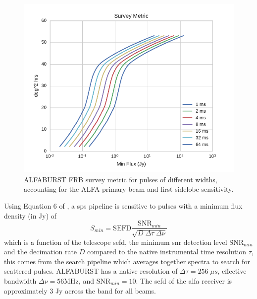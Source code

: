 \documentclass[a4paper,fleqn,usenatbib]{mnras}
\begin{document}
\begin{figure}
    \includegraphics[width=1.0\linewidth]{figures/survey_metric.pdf}
    \caption{ALFABURST FRB survey metric for pulses of different widths,
    accounting for the ALFA primary beam and first sidelobe sensitivity.
    }
    \label{fig:survey_metric}
\end{figure}


Using Equation 6 of \cite{2015MNRAS.452.1254K}, a \gls*{sps} pipeline is
sensitive to pulses with a minimum flux density (in Jy) of
%
\begin{equation}
S_{min} = \textrm{SEFD} \frac{\textrm{SNR}_{min}}{\sqrt{D \; \Delta \tau \;
\Delta \nu}}
\end{equation}
%
which is a function of the telescope \gls*{sefd}, the minimum \gls*{snr}
detection level $\textrm{SNR}_{min}$ and the decimation rate $D$ compared to the
native instrumental time resolution $\tau$, this comes from the search pipeline
which averages together spectra to search for scattered pulses. ALFABURST has a
native resolution of $\Delta \tau = 256 \; \mu s$, effective bandwidth $\Delta
\nu = 56 \textrm{MHz}$, and $\textrm{SNR}_{min} = 10$. The \gls*{sefd} of the
\gls*{alfa} receiver is approximately 3 Jy across the band for all beams.
\end{document}

